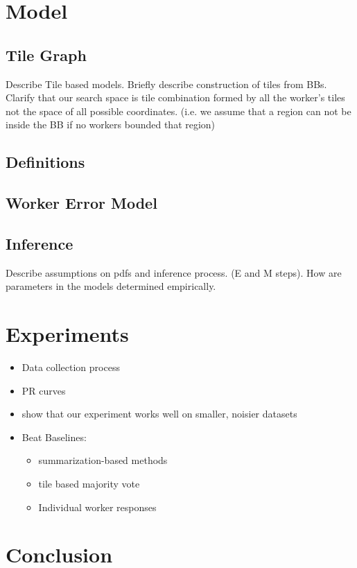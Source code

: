 \documentclass[letterpaper]{article} %
\begin{document}
\section{Model}
\subsection{Tile Graph} Describe Tile based models. Briefly describe construction of tiles from BBs.
Clarify that our search space is tile combination formed by all the worker's tiles not the space of all possible coordinates. (i.e. we assume that a region can not be inside the BB if no workers bounded that region) 
\subsection{Definitions}
\subsection{Worker Error Model}
\subsection{Inference}
Describe assumptions on pdfs and inference process. (E and M steps). How are parameters in the models determined empirically.
\section{Experiments}
\begin{itemize}
\item Data collection process
\item PR curves
\item show that our experiment works well on smaller, noisier datasets
\item Beat Baselines: 
\begin{itemize}
\item summarization-based methods
\item tile based majority vote 
\item Individual worker responses
\end{itemize}
\end{itemize}
\section{Conclusion}


\end{document}
